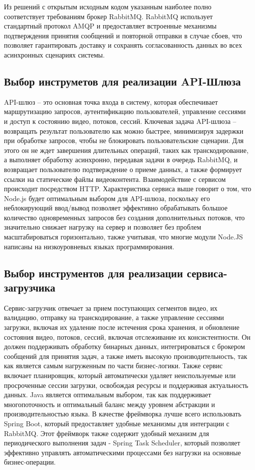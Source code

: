 	Из решений с открытым исходным кодом указанным наиболее полно соответствует требованиям брокер RabbitMQ. RabbitMQ использует стандартный протокол AMQP и предоставляет встроенные механизмы подтверждения принятия сообщений и повторной отправки в случае сбоев, что позволяет гарантировать доставку и сохранять согласованность данных во всех асинхронных сценариях системы.

	\subsection{Выбор инструметов для реализации API-Шлюза}
	
	API-шлюз – это основная точка входа в систему, которая обеспечивает маршрутизацию запросов, аутентификацию пользователей, управление сессиями и доступ к состоянию видео, потоков, сессий. Ключевая задача API-шлюза – возвращать результат пользователю как можно быстрее, минимизируя задержки при обработке запросов, чтобы не блокировать пользовательские сценарии. Для этого он не ждет завершения длительных операций, таких как транскодирование, а выполняет обработку асинхронно, передавая задачи в очередь RabbitMQ, и возвращает пользователю подтверждение о приеме данных, а также формирует ссылки на статические файлы видеоконтента. Взаимодействие с сервисом происходит посредством HTTP. Характеристика сервиса выше говорит о том, что Node.js будет оптимальным выбором для API-шлюза, поскольку его неблокирующий ввод/вывод позволяет эффективно обрабатывать большое количество одновременных запросов без создания дополнительных потоков, что значительно снижает нагрузку на сервер и позволяет без проблем масштабироваться горизонтально, также учитывая, что многие модули Node.JS написаны на низкоуровневых языках программирования.

	\subsection{Выбор инструментов для реализации сервиса-загрузчика}

	Сервис-загрузчик отвечает за прием поступающих сегментов видео, их валидацию, отправку на транскодирование, а также управление сессиями загрузки, включая их удаление после истечения срока хранения, и обновление состояния видео, потоков, сессий, включая отслеживание их консистентности. Он должен поддерживать обработку бинарных данных, интегрироваться с брокером сообщений для принятия задач, а также иметь высокую производительность, так как является самым нагруженным по части бизнес-логики. Также сервис включает планировщик, который автоматически удаляет неиспользуемые или просроченные сессии загрузки, освобождая ресурсы и поддерживая актуальность данных. Java является оптимальным выбором, так как поддерживает многопоточность и оптимальный баланс между уровнем абстракции и производительностью языка. В качестве фреймворка лучше всего использовать Spring Boot, который предоставляет удобные механизмы для интеграции с RabbitMQ. Этот фреймворк также содержит удобный механизм для периодического выполнения задач - Spring Task Scheduler, который позволяет эффективно управлять автоматическими процессами без нагрузки на основные бизнес-операции.
	
